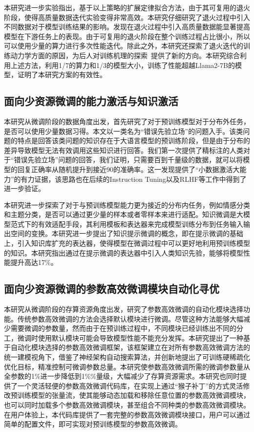 本研究进一步实验指出，基于以上策略的扩展定律拟合方法，由于其可复用的退火阶段，使得高质量数据迭代实验变得非常高效。本研究仔细研究了退火过程中引入不同数据对于模型训练结果的影响。发现在退火过程中引入高质量数据能显著提高模型在下游任务上的表现。由于可复用的退火阶段在整个训练过程占比很小，所以可以使用少量的算力进行多次性能迭代。除此之外，本研究还探索了退火迭代的训练动力学方面的原因，为后人对训练机理的探索~\cite{wen2024understanding}提供了新的方向。本研究综合利用上述方法，利用1/7的算力和1/3的模型大小，训练了性能超越Llama2-7B的模型，证明了本研究方案的有效性。

\subsection{面向少资源微调的能力激活与知识激活}
本研究从微调阶段的数据角度出发，首先研究了对于预训练模型对于分布外任务，是否可以使用少量数据习得。本文以一类名为“错误先验立场”的问题入手。该类问题的特点是回答该类问题的知识存在于大语言模型的预训练阶段，但是由于分布的差异导致模型无法有效调用这些知识进行回答。我们第一次提供了精标注的人类对于“错误先验立场”问题的回答，我们证明，只需要百到千量级的数据，就可以将模型的回复正确率从随机提升到接近90的准确率。这一发现提供了“小数据激活大能力”的有力证据，该思路也在后续的Instruction Tuning以及RLHF等工作中得到了进一步验证。

本研究进一步探索了对于与预训练模型能力更为接近的分布内任务，例如情感分类和主题分类，是否可以通过更少量的样本或者零样本来进行适配。知识微调是大模型范式下的有效适配手段，其利用模板和表达器来完成模型训练分布到任务输入输出空间的变换。本研究进一步提出了知识提示微调的概念，即在提示微调的基础上，引入知识库扩充的表达器，使得模型在微调过程中可以更好地利用预训练模型的知识。本研究指出通过在提示微调的表达器中引入人类知识先验，能够将模型性能提升高达17\%。

\subsection{面向少资源微调的参数高效微调模块自动化寻优}
本研究从微调阶段的存算资源角度出发，研究了参数高效微调的自动化模块选择功能。传统参数高效微调的方法会选择默认模块进行微调。尽管这种方法能够大幅减少需要微调的参数量，然而由于在预训练过程中，不同模块已经训练出不同的分工，微调时使用默认模块可能会导致模型性能不能充分发挥。本研究提出了一种基于自动化模块选择的参数高效微调框架，该框架建立在对所有参数高效微调方法的统一建模视角下，借鉴了神经架构自动搜索算法，并创新地提出了可训练硬稀疏化优化目标，精准控制可微调参数总量。本研究使参数高效微调所需的微调参数量从全参数的1\%进一步降低到1\%\%量级，大幅减少了存算资源需求。本研究也同时提供了一个灵活轻便的参数高效微调代码库，在实现上通过“猴子补丁”的方式灵活修改预训练模型的张量流，使其能够动态加载和移除任意位置的参数高效微调模块，也可以同时加载多个参数高效微调模块，甚至组合不同种类的参数高效微调模块。在用户体验上，本代码库提供了一套完整的参数高效微调模块接口，用户可以通过简单的配置文件，即可实现对预训练模型的参数高效微调。



